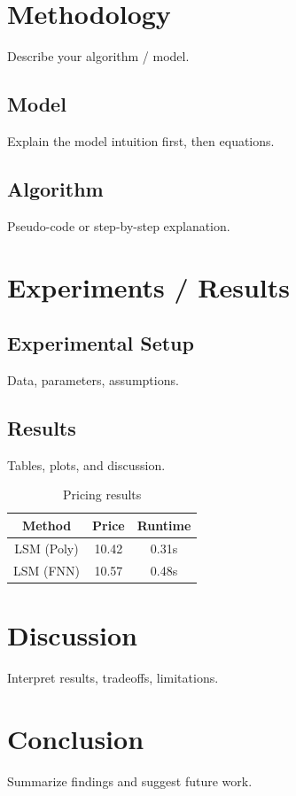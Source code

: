 \documentclass[11pt]{article}
\theoremstyle{definition}
\theoremstyle{plain}
\theoremstyle{remark}
\begin{document}
\section{Methodology}
\label{sec:method}

Describe your algorithm / model.

\subsection{Model}
Explain the model intuition first, then equations.

\subsection{Algorithm}
Pseudo-code or step-by-step explanation.

\section{Experiments / Results}
\label{sec:results}

\subsection{Experimental Setup}
Data, parameters, assumptions.

\subsection{Results}
Tables, plots, and discussion.

\begin{table}[H]
\centering
\begin{tabular}{ccc}
\toprule
Method & Price & Runtime \\
\midrule
LSM (Poly) & 10.42 & 0.31s \\
LSM (FNN)  & 10.57 & 0.48s \\
\bottomrule
\end{tabular}
\caption{Pricing results}
\end{table}

\section{Discussion}
\label{sec:discussion}

Interpret results, tradeoffs, limitations.

\section{Conclusion}
\label{sec:conclusion}

Summarize findings and suggest future work.



\end{document}
